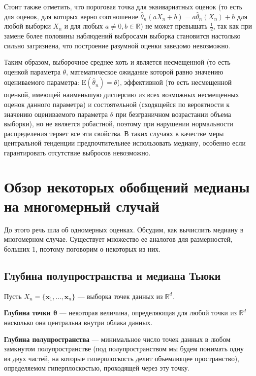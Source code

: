 \documentclass[specialist,
substylefile = spbu.rtx,
               subf,href,colorlinks=true, 12pt]{disser}
\begin{document}
Стоит также отметить, что пороговая точка для эквивариатных оценок (то есть для оценок, для которых верно соотношение $\widehat{\theta}_n(a X_n+b)=a\widehat{\theta}_n(X_n)+b$ для любой выборки $X_n$ и для любых $a\neq 0, b\in\mathbb{R}$) не может превышать $\frac{1}{2}$, так как при замене более половины наблюдений выбросами выборка становится настолько сильно загрязнена, что построение разумной оценки заведомо невозможно. 


Таким образом, выборочное среднее хоть и является несмещенной \cite{zhao_statistical_2012} (то есть оценкой параметра $\theta$, математическое ожидание которой равно значению оцениваемого параметра: $\mathrm{E}(\widehat {\theta}_n)=\theta$), эффективной  \cite{zhao_statistical_2012}  (то есть несмещенной оценкой, имеющей наименьшую дисперсию из всех возможных несмещенных оценок данного параметра) и состоятельной  \cite{zhao_statistical_2012} 
 (сходящейся по вероятности к значению оцениваемого параметра $\theta$ при безграничном возрастании объема выборки), но не является робастной, поэтому при нарушении нормальности распределения теряет все эти свойства.  В таких случаях в качестве меры центральной тенденции предпочтительнее использовать медиану, особенно если гарантировать отсутствие выбросов невозможно.

\chapter{Обзор некоторых обобщений медианы на многомерный случай}

До этого речь шла об одномерных оценках. Обсудим, как вычислить медиану в многомерном случае. Существует множество ее аналогов для размерностей, больших 1, поэтому поговорим о некоторых из них.

\section{Глубина полупространства и медиана Тьюки}

Пусть $X_n=\{\mathbf{x}_1,\ldots,\mathbf{x}_n\}$ --- выборка точек данных из $\mathbb{R}^d$.

\textbf{Глубина точки $\boldsymbol{\theta}$} \cite{tukey1975} --- некоторая величина, определяющая для любой точки из $\mathbb{R}^d$ насколько она центральна внутри облака данных. 

\textbf{Глубина полупространства} \cite{tukey1975} --- минимальное число точек данных в любом замкнутом полупространстве (под полупространством мы будем понимать одну из двух частей, на которые гиперплоскость делит объемлющее пространство), определяемом гиперплоскостью, проходящей через эту точку. 
\end{document}
